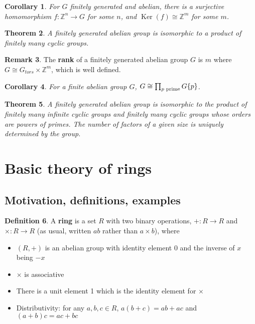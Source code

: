 \documentclass[12pt]{article}
\newtheorem{thm}{Theorem}[section]
\newtheorem{cor}[thm]{Corollary}
\theoremstyle{definition}
\newtheorem{defn}[thm]{Definition}
\newtheorem{rmk}[thm]{Remark}
\newcommand{\Z}{\mathbb{Z}}
\DeclareMathOperator{\Ker}{Ker}
\begin{document}
\begin{cor}
  For $G$ finitely generated and abelian, there is a surjective homomorphism $f : \Z^n \to G$ for some $n$, and $\Ker(f) \cong \Z^m$ for some $m$.
\end{cor}

\begin{thm}
  A finitely generated abelian group is isomorphic to a product of finitely many cyclic groups.
\end{thm}

\begin{rmk}
  The \textbf{rank} of a finitely generated abelian group $G$ is $m$ where $G \cong G_{tors} \times \Z^m$, which is well defined.
\end{rmk}

\begin{cor}
  For a finite abelian group $G$, $G \cong \prod_{p \textnormal{ prime}}G\{p\}$.
\end{cor}

\begin{thm}
  A finitely generated abelian group is isomorphic to the product of finitely many infinite cyclic groups and finitely many cyclic groups whose orders are powers of primes.
  The number of factors of a given size is uniquely determined by the group.
\end{thm}

\section{Basic theory of rings}

\subsection{Motivation, definitions, examples}

\begin{defn}
  A \textbf{ring} is a set $R$ with two binary operations, $+ : R \to R$ and $\times : R \to R$ (as usual, written $ab$ rather than $a \times b$), where
  \begin{itemize}
    \item $(R, +)$ is an abelian group with identity element 0 and the inverse of $x$ being $-x$
    \item $\times$ is associative
    \item There is a unit element 1 which is the identity element for $\times$
    \item Distributivity: for any $a, b, c \in R$, $a(b + c) = ab + ac$ and $(a + b)c = ac + bc$
  \end{itemize}
\end{defn}
\end{document}

